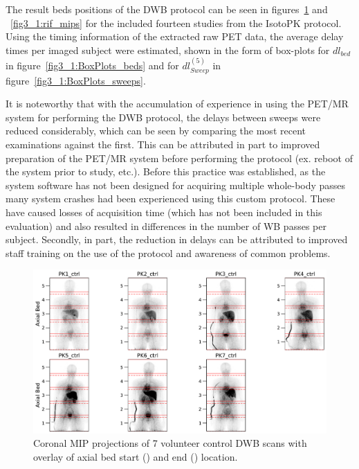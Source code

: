 The result beds positions of the DWB protocol can be seen in figures~\ref{fig3_1:ctrl_mips} and ~\ref{fig3_1:rif_mips} for the included fourteen studies from the IsotoPK protocol.
Using the timing information of the extracted raw PET data, the average delay times per imaged subject were estimated, shown in the form of box-plots for $dl_{bed}$ in figure~\ref{fig3_1:BoxPlots_beds} and for $dl_{Sweep}^{(5)}$ in figure~\ref{fig3_1:BoxPlots_sweeps}.

It is noteworthy that with the accumulation of experience in using the PET/MR system for performing the DWB protocol, the delays between sweeps were reduced considerably, which can be seen by comparing the most recent examinations against the first. This can be attributed in part to improved preparation of the PET/MR system before performing the protocol (ex. reboot of the system prior to study, etc.). Before this practice was established, as the system software has not been designed for acquiring multiple whole-body passes many system crashes had been experienced using this custom protocol. These have caused losses of acquisition time (which has not been included in this evaluation) and also resulted in differences in the number of WB passes per subject. Secondly, in part, the reduction in delays can be attributed to improved staff training on the use of the protocol and awareness of common problems.
%
%
\begin{figure} [ht!]
\centering
\includegraphics[scale=0.5,angle=0]{3_Results/3_1_DWB_Optimization/figures/3_1_MIPS_ctrl.pdf}
\caption{Coronal MIP projections of 7 volunteer control DWB scans with overlay of axial bed start (\protect{}) and end (\protect{}) location.} 
\label{fig3_1:ctrl_mips}
\end{figure}

